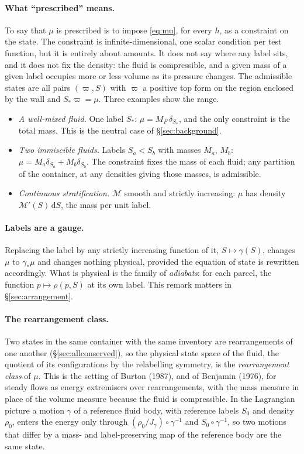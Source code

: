 \documentclass[11pt]{article}
\theoremstyle{definition}
\theoremstyle{remark}
\newcommand{\Mcdf}{\mathcal M}
\begin{document}
\paragraph{What ``prescribed'' means.} To say that $\mu$ is prescribed
is to impose \eqref{eq:mu}, for every $h$, as a constraint on the
state. The constraint is infinite-dimensional, one scalar condition
per test function, but it is entirely about amounts. It does not say
where any label sits, and it does not fix the density: the fluid is
compressible, and a given mass of a given label occupies more or less
volume as its pressure changes. The admissible states are all pairs
$(\varpi, S)$ with $\varpi$ a positive top form on the region enclosed
by the wall and $S_*\varpi = \mu$. Three examples show the range.
\begin{itemize}
\item \emph{A well-mixed fluid.} One label $S_*$: $\mu = M_F\,
  \delta_{S_*}$, and the only constraint is the total mass. This is
  the neutral case of \S\ref{sec:background}.
\item \emph{Two immiscible fluids.} Labels $S_a < S_b$ with masses
  $M_a$, $M_b$: $\mu = M_a\delta_{S_a} + M_b\delta_{S_b}$. The
  constraint fixes the mass of each fluid; any partition of the
  container, at any densities giving those masses, is admissible.
\item \emph{Continuous stratification.} $\Mcdf$ smooth and strictly
  increasing: $\mu$ has density $\Mcdf'(S)\,\mathrm dS$, the mass per
  unit label.
\end{itemize}

\paragraph{Labels are a gauge.} Replacing the label by any strictly
increasing function of it, $S \mapsto \gamma(S)$, changes $\mu$ to
$\gamma_*\mu$ and changes nothing physical, provided the equation of
state is rewritten accordingly. What is physical is the family of
\emph{adiabats}: for each parcel, the function $p \mapsto \rho(p, S)$
at its own label. This remark matters in \S\ref{sec:arrangement}.

\paragraph{The rearrangement class.} Two states in the same container
with the same inventory are rearrangements of one another
(\S\ref{sec:allconserved}), so the physical state space of the fluid,
the quotient of its configurations by the relabelling symmetry, is the
\emph{rearrangement class} of $\mu$. This is the setting of Burton
(1987), and of Benjamin (1976), for steady flows as energy extremisers
over rearrangements, with the mass measure in place of the volume
measure because the fluid is compressible. In the Lagrangian picture a
motion $\gamma$ of a reference fluid body, with reference labels $S_0$
and density $\rho_0$, enters the energy only through
$(\rho_0/J_\gamma)\circ\gamma^{-1}$ and $S_0\circ\gamma^{-1}$, so two
motions that differ by a mass- and label-preserving map of the
reference body are the same state.
\end{document}
